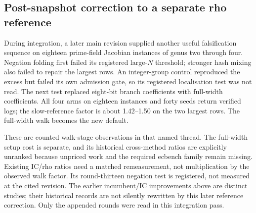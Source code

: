 \subsection{Post-snapshot correction to a separate rho reference}

During integration, a later main revision supplied another useful
falsification sequence on eighteen prime-field Jacobian instances of
genus two through four. Negation folding first failed its registered
large-$N$ threshold; stronger hash mixing also failed to repair the
largest rows. An integer-group control reproduced the excess but failed
its own admission gate, so its registered localisation test was not read.
The next test replaced eight-bit branch coefficients with full-width
coefficients. All four arms on eighteen instances and forty seeds return
verified logs; the slow-reference factor is about 1.42--1.50 on the two
largest rows. The full-width walk becomes the new default.

These are counted walk-stage observations in that named thread. The
full-width setup cost is separate, and its historical cross-method ratios
are explicitly unranked because unpriced work and the required ecbench
family remain missing. Existing IC/rho ratios need a matched remeasurement,
not multiplication by the observed walk factor. Its round-thirteen
negation test is registered, not measured at the cited revision. The
earlier incumbent/IC improvements above are distinct studies; their
historical records are not silently rewritten by this later reference
correction. Only the appended rounds were read in this integration pass.
